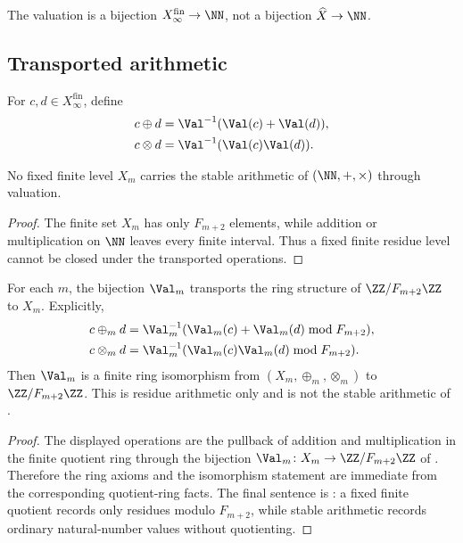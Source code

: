 \begin{remark}\label{rem:finite-vs-profinite}
The valuation is a bijection \(X_\infty^{\mathrm{fin}}\to\NN\), not a bijection
\(\widehat X\to\NN\).
\end{remark}

\subsection{Transported arithmetic}\label{ssec:arith}

\begin{definition}\label{def:stable-arith}
For \(c,d\in X_\infty^{\mathrm{fin}}\), define
\begin{align}
  c\oplus d&=\Val^{-1}(\Val(c)+\Val(d)),\label{eq:stable-add}\\
  c\otimes d&=\Val^{-1}(\Val(c)\Val(d)).\label{eq:stable-mul}
\end{align}
\end{definition}

\begin{proposition}
\label{prop:finite-residue-not-stable}
No fixed finite level \(X_m\) carries the stable arithmetic of
\((\NN,+,\times)\) through valuation.
\end{proposition}

\begin{proof}
The finite set \(X_m\) has only \(F_{m+2}\) elements, while addition or
multiplication on \(\NN\) leaves every finite interval.  Thus a fixed finite
residue level cannot be closed under the transported operations.
\end{proof}

\begin{proposition}
\label{prop:finite-residue-level-transport}
For each \(m\), the bijection \(\Val_m\) transports the ring structure of
\(\ZZ/F_{m+2}\ZZ\) to \(X_m\).  Explicitly,
\[
\begin{aligned}
  c\oplus_m d&=\Val_m^{-1}(\Val_m(c)+\Val_m(d)\bmod F_{m+2}),\\
  c\otimes_m d&=\Val_m^{-1}(\Val_m(c)\Val_m(d)\bmod F_{m+2}).
\end{aligned}
\]
Then \(\Val_m\) is a finite ring isomorphism from
\((X_m,\oplus_m,\otimes_m)\) to \(\ZZ/F_{m+2}\ZZ\).  This is residue arithmetic
only and is not the stable arithmetic of .
\end{proposition}

\begin{proof}
The displayed operations are the pullback of addition and multiplication in the
finite quotient ring through the bijection
\(\Val_m\colon X_m\to\ZZ/F_{m+2}\ZZ\) of
.  Therefore the ring axioms and
the isomorphism statement are immediate from the corresponding quotient-ring
facts.  The final sentence is : a fixed
finite quotient records only residues modulo \(F_{m+2}\), while stable
arithmetic records ordinary natural-number values without quotienting.
\end{proof}

